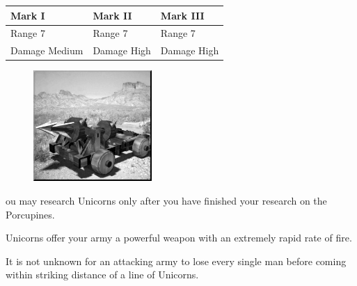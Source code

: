\begin{tabular}{ | p{1.3in} | p{1.3in} | p{1.3in} |}
	\hline
	\textbf{Mark I}	& \textbf{Mark II} & \textbf{Mark III} \\ \hline
	Range 7	& Range 7 & Range 7 \\ \hline
	Damage Medium	& Damage High & Damage High \\ \hline
\end{tabular}

\begin{figure}
	\vspace{-20pt}
	\begin{center}
		\includegraphics[width=0.4\textwidth]{Aunicorn}
	\end{center}
\end{figure}

ou may research Unicorns only after you have finished your research on the Porcupines.

Unicorns offer your army a powerful weapon with an extremely rapid rate of fire.

It is not unknown for an attacking army to lose every single man before coming within striking distance of a line of Unicorns.